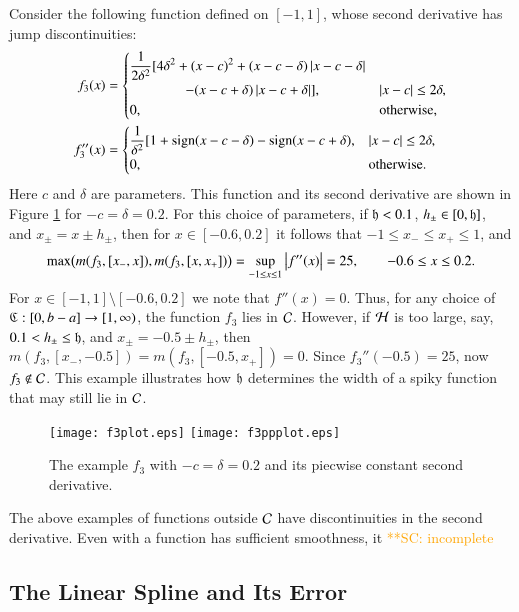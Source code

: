 \documentclass[review]{elsarticle}
\newcommand{\scnote}[1]{ {\textcolor{orange}  {\mbox{**SC:} #1}}}
\begin{document}
Consider the following function defined on $[-1,1]$, whose second derivative has jump discontinuities:
\begin{align*}
f_3(x) & = \begin{cases} \displaystyle \frac{1}{2\delta^2} [4 \delta^2 + (x-c)^2 + (x-c-\delta)\left \lvert x-c-\delta \right \rvert \\
\qquad \qquad - (x-c+\delta)\left \lvert x-c+\delta \right \rvert], & \left \lvert x-c \right \rvert \le 2\delta, \\
0, & \text{otherwise},
\end{cases} \\
f''_3(x) & = \begin{cases} \displaystyle \frac{1}{\delta^2} [1 + \operatorname{sign}(x-c-\delta) - \operatorname{sign}(x-c+\delta), & \left \lvert x-c \right \rvert \le 2\delta, \\
0, & \text{otherwise}.
\end{cases}
\end{align*}
Here $c$ and $\delta$ are parameters. This function and its second derivative
are shown in Figure \ref{f3fig} for $-c=\delta = 0.2$. For this choice of
parameters, if $\mathfrak{h} < 0.1$, $h_\pm \in [0,\mathfrak{h}]$, and $x_\pm = x\pm h_\pm$, then
for $x \in [-0.6, 0.2]$ it follows that $-1 \le x_- \le x_+ \le 1$, and
\[
\max\bigl(m(f_3,[x_-,x]),m(f_3,[x,x_+])\bigr) = \sup_{-1 \le x \le 1} \left \lvert f''(x) \right \rvert = 25, \qquad -0.6 \le x \le 0.2.
\]
For $x \in [-1,1] \setminus [-0.6, 0.2]$ we note that $f''(x) = 0$. Thus, for
any choice of $\mathfrak{C} : [0,b-a] \to [1,\infty)$, the function $f_3$ lies in $\mathcal{C}$.
However, if $\mathcal{H}$ is too large, say, $0.1 < h_\pm \le \mathfrak{h}$, and $x_\pm = -0.5\pm
h_\pm$, then $m(f_3,[x_-,-0.5])=m(f_3,[-0.5,x_+])=0$. Since $f_3''(-0.5) = 25$,
now $f_3 \notin \mathcal{C}$. This example illustrates how $\mathfrak{h}$ determines the width of
a spiky function that may still lie in $\mathcal{C}$.

\begin{figure}[t]
\centering
\texttt{[image: f3plot.eps]} \qquad
\texttt{[image: f3ppplot.eps]} 
\caption{The example $f_3$ with $-c=\delta = 0.2$  and its piecwise constant second derivative.}
\label{f3fig}
\end{figure}

The above examples of functions outside $\mathcal{C}$ have discontinuities in the second
derivative. Even with a function has sufficient smoothness, it \scnote{incomplete}

\subsection{The Linear Spline and Its Error}
\end{document}
